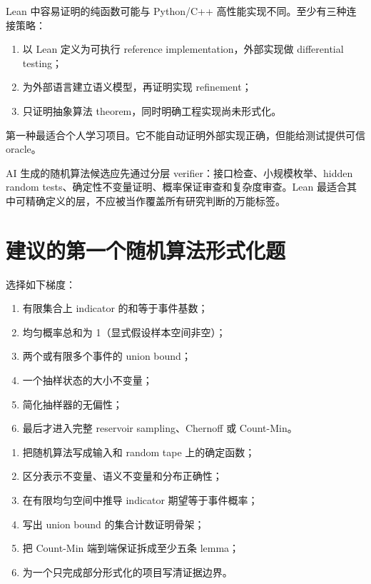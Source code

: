 Lean 中容易证明的纯函数可能与 Python/C++ 高性能实现不同。至少有三种连接策略：
\begin{enumerate}
  \item 以 Lean 定义为可执行 reference implementation，外部实现做 differential testing；
  \item 为外部语言建立语义模型，再证明实现 refinement；
  \item 只证明抽象算法 theorem，同时明确工程实现尚未形式化。
\end{enumerate}
第一种最适合个人学习项目。它不能自动证明外部实现正确，但能给测试提供可信 oracle。

\begin{aibox}
AI 生成的随机算法候选应先通过分层 verifier：接口检查、小规模枚举、hidden random tests、确定性不变量证明、概率保证审查和复杂度审查。Lean 最适合其中可精确定义的层，不应被当作覆盖所有研究判断的万能标签。
\end{aibox}

\section{建议的第一个随机算法形式化题}

选择如下梯度：
\begin{enumerate}
  \item 有限集合上 indicator 的和等于事件基数；
  \item 均匀概率总和为 1（显式假设样本空间非空）；
  \item 两个或有限多个事件的 union bound；
  \item 一个抽样状态的大小不变量；
  \item 简化抽样器的无偏性；
  \item 最后才进入完整 reservoir sampling、Chernoff 或 Count-Min。
\end{enumerate}

\begin{checkpointbox}
\begin{enumerate}
  \item 把随机算法写成输入和 random tape 上的确定函数；
  \item 区分表示不变量、语义不变量和分布正确性；
  \item 在有限均匀空间中推导 indicator 期望等于事件概率；
  \item 写出 union bound 的集合计数证明骨架；
  \item 把 Count-Min 端到端保证拆成至少五条 lemma；
  \item 为一个只完成部分形式化的项目写清证据边界。
\end{enumerate}
\end{checkpointbox}
